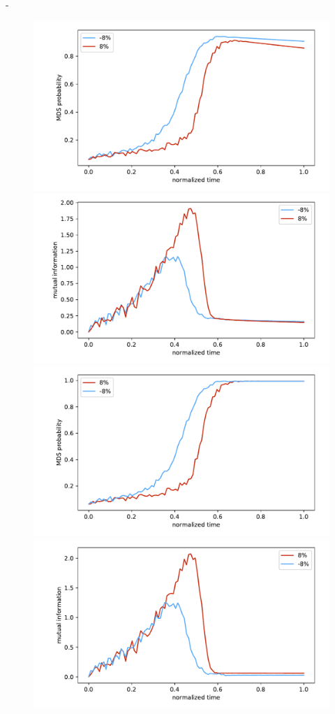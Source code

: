 -\documentclass[prd,twocolumn,tightenlines,preprintnumbers,showpacs,superscriptaddress,notitlepage,nofootinbib,eqsecnum,floatfix,longbibliography]{revtex4}
\begin{document}
\begin{figure}
    \centering
    \includegraphics[width=\columnwidth]{./figures/full_prob_deco.pdf}
    \includegraphics[width=\columnwidth]{./figures/mutual_info_deco.pdf}
    \includegraphics[width=\columnwidth]{./figures/full_prob_nodeco.pdf}
    \includegraphics[width=\columnwidth]{./figures/mutual_info_nodeco.pdf}

\end{figure}
\end{document}
